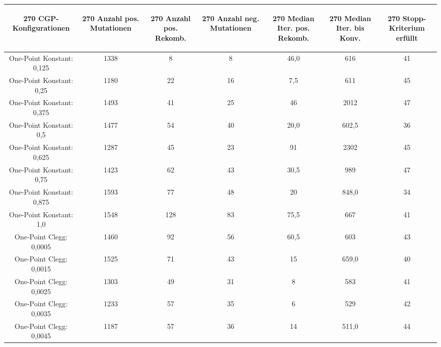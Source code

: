 \begin{table}[H]
	\centering
	\begin{tabular}{c | c | c | c | c | c | c}
		\begin{turn}{270} \textbf{CGP-Konfigurationen} \end{turn} & \begin{turn}{270} \textbf{Anzahl pos. Mutationen} \end{turn} & \begin{turn}{270} \textbf{Anzahl pos. Rekomb.} \end{turn} & \begin{turn}{270} \textbf{Anzahl neg. Mutationen} \end{turn} & \begin{turn}{270} \textbf{Median Iter. pos. Rekomb.} \end{turn} & \begin{turn}{270} \textbf{Median Iter. bis Konv.} \end{turn} & \begin{turn}{270} \textbf{Stopp-Kriterium erfüllt} \end{turn}\\
		\hline
		One-Point Konstant: 0,125 & 1338 & 8 & 8 & 46,0 & 616 & 41\\
		\hline
		One-Point Konstant: 0,25 & 1180 & 22 & 16 & 7,5 & 611 & 45\\
		\hline
		One-Point Konstant: 0,375 & 1493 & 41 & 25 & 46 & 2012 & 47\\
		\hline
		One-Point Konstant: 0,5 & 1477 & 54 & 40 & 20,0 & 602,5 & 36\\
		\hline
		One-Point Konstant: 0,625 & 1287 & 45 & 23 & 91 & 2302 & 45\\
		\hline
		One-Point Konstant: 0,75 & 1423 & 62 & 43 & 30,5 & 989 & 47\\
		\hline
		One-Point Konstant: 0,875 & 1593 & 77 & 48 & 20 & 848,0 & 34\\
		\hline
		One-Point Konstant: 1,0 & 1548 & 128 & 83 & 75,5 & 667 & 41\\
		\hline
		One-Point Clegg: 0,0005 & 1460 & 92 & 56 & 60,5 & 603 & 43\\
		\hline
		One-Point Clegg: 0,0015 & 1525 & 71 & 43 & 15 & 659,0 & 40\\
		\hline
		One-Point Clegg: 0,0025 & 1303 & 49 & 31 & 8 & 583 & 41\\
		\hline
		One-Point Clegg: 0,0035 & 1233 & 57 & 35 & 6 & 529 & 42\\
		\hline
		One-Point Clegg: 0,0045 & 1187 & 57 & 36 & 14 & 511,0 & 44\\

\end{tabular}
\end{table}
